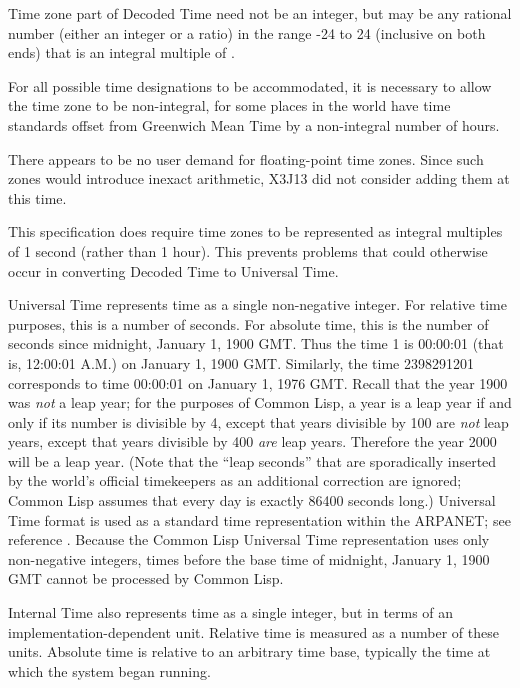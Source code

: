 Time zone part of Decoded Time need not be an integer,
but may be any rational number (either an integer or a ratio)
in the range -24 to 24 (inclusive on both ends)
that is an integral multiple of .

\beforenoterule
\begin{rationale}
For all possible time designations to be accommodated, it is
    necessary to allow the time zone to be non-integral, for some places
    in the world have time standards offset from Greenwich Mean Time
    by a non-integral number of hours.

    There appears to be no user demand for floating-point time zones.  Since such
    zones would introduce inexact arithmetic, X3J13 did not consider
    adding them at this time.

This specification does require time zones to be represented as integral multiples
    of 1 second (rather than 1 hour).  This prevents problems that could otherwise
occur in converting Decoded Time to Universal Time.
\end{rationale}
\afternoterule

Universal Time represents time as a single non-negative integer.
For relative time
purposes, this is a number of seconds.  For absolute time, this is the
number of seconds since midnight, January 1, 1900 {GMT}.  Thus the time 1
is 00:00:01 (that is, 12:00:01 A.M.) on January 1, 1900 {GMT}.
Similarly, the time 2398291201 corresponds to time 00:00:01 on January 1,
1976 {GMT}.
Recall that the year 1900 was \emph{not} a leap year; for the purposes of
Common Lisp, a year is a leap year if and only if its number is divisible by 4, except
that years divisible by 100 are \emph{not} leap years, except that years
divisible by 400 \emph{are} leap years.  Therefore the year 2000 will
be a leap year.
(Note that the ``leap seconds'' that
are sporadically inserted by the world's official timekeepers as an additional
correction are ignored; Common Lisp assumes that every day is exactly 86400
seconds long.)
Universal Time format is used as a standard time
representation within the {ARPANET}; see reference \cite{KLH-TIME-SERVER}.
Because the Common Lisp Universal Time representation uses only
non-negative integers, times before the base time of midnight,
January 1, 1900 {GMT} cannot be processed by Common Lisp.

Internal Time also represents time as a single integer, but
in terms of an implementation-dependent unit.
Relative time is measured as a number of these units.
Absolute time is relative to an arbitrary time base, typically
the time at which the system began running.

